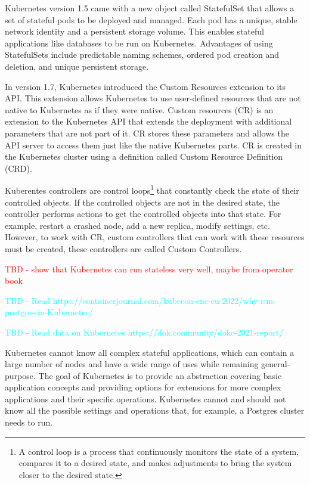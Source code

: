 Kubernetes version 1.5 came with a new object called StatefulSet that allows a set of stateful pods to be deployed and managed. Each pod has a unique, stable network identity and a persistent storage volume. This enables stateful applications like databases to be run on Kubernetes. Advantages of using StatefulSets include predictable naming schemes, ordered pod creation and deletion, and unique persistent storage. \cite{docuKubeStatefulSet} \cite{githubKube15}

In version 1.7, Kubernetes introduced the Custom Resources extension to its API. \cite{githubIBMCr} This extension allows Kubernetes to use user-defined resources that are not native to Kubernetes as if they were native. \cite{NewStackCRDs} Custom resources (CR) is an extension to the Kubernetes API that extends the deployment with additional parameters that are not part of it. CR stores these parameters and allows the API server to access them just like the native Kubernetes parts. CR is created in the Kubernetes cluster using a definition called Custom Resource Definition (CRD). \cite{operatorsAtK8sIface}

Kuberentes controllers are control loops\footnote[1]{A control loop is a process that continuously monitors the state of a system, compares it to a desired state, and makes adjustments to bring the system closer to the desired state.} that constantly check the state of their controlled objects. If the controlled objects are not in the desired state, the controller performs actions to get the controlled objects into that state. For example, restart a crashed node, add a new replica, modify settings, etc. \cite{docuKubeControllers}
However, to work with CR, custom controllers that can work with these resources must be created, these controllers are called Custom Controllers. \cite{docuKubeCR}



\textcolor{red}{TBD - show that Kubernetes can run stateless very well, maybe from operator book}


\textcolor{cyan}{TBD - Read https://containerjournal.com/kubecon-cnc-eu-2022/why-run-postgres-in-Kubernetes/}

\textcolor{cyan}{TBD - Read data on Kubernetes https://dok.community/dokc-2021-report/}


\label{chap:postgresInKube}
Kubernetes cannot know all complex stateful applications, which can contain a large number of nodes and have a wide range of uses while remaining general-purpose. The goal of Kubernetes is to provide an abstraction covering basic application concepts and providing options for extensions for more complex applications and their specific operations. Kubernetes cannot and should not know all the possible settings and operations that, for example, a Postgres cluster needs to run. \cite{operatorsTeaches}

